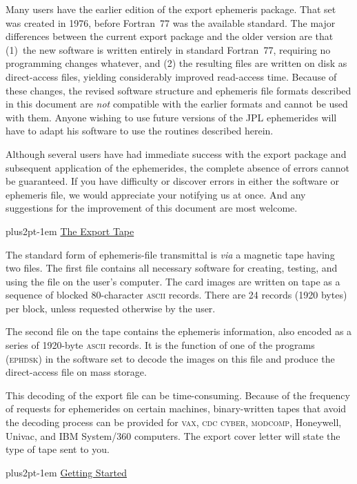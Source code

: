\documentclass[twoside,11pt]{article}
\renewcommand{\_}{\texttt{\symbol{95}}}
\newcommand{\hdg}[1]{\vskip4pt plus2pt\leavevmode\kern-1em \underline{\large{#1}}\par}
\newcommand{\hdg}[1]{\subsection*{{#1}}}
\begin{document}
Many users have the earlier edition of the export ephemeris
package. That set was created in 1976, before Fortran~77 was
the available standard.
The major differences between the current export package and
the older version are that (1)~the new software is
written entirely in standard Fortran~77, requiring no programming changes
whatever, and (2) the resulting files are written on disk as
direct-access files, yielding considerably improved read-access time.
Because of these changes,
the revised software structure and ephemeris
file formats described in this document are {\it not\/} compatible
with the earlier formats and cannot be used with them.
Anyone wishing to use future versions of the JPL ephemerides
will have to adapt his software to use the routines described
herein.

Although several users have had immediate success with the export
package and subsequent application of the ephemerides, the complete
absence of errors cannot be guaranteed. If you have difficulty
or discover errors in either the software or ephemeris file,
we would appreciate your notifying us at once. And any suggestions
for the improvement of this document are most welcome.

\hdg{The Export Tape}

The standard form of ephemeris-file transmittal is {\sl via\/}
a magnetic tape having two files. The first file contains
all necessary software for creating, testing, and using the file
on the user's computer. The card images are written on tape as a sequence
of blocked 80-character \textsc{ascii} records. There are 24 records
(1920 bytes)
per block, unless requested otherwise by the user.

The second file on the tape contains the ephemeris information,
also encoded as a series of 1920-byte \textsc{ascii} records.
It is the function of one of the programs (\textsc{ephdsk}) in the software
set to decode the images on this file and produce the direct-access
file on mass storage.

This decoding of the export file can be
time-consuming. Because of the frequency of requests for ephemerides
on certain machines, binary-written tapes that avoid the
decoding process can be provided for \textsc{vax, cdc cyber, modcomp},
Honeywell, Univac, and IBM System/360 computers.
The export cover letter will state the type of tape sent to you.


\hdg{Getting Started}
\end{document}
